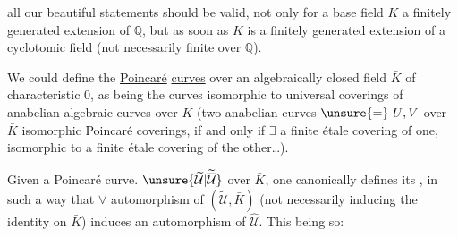 all our beautiful statements should be valid, not only for a base field $K$ a finitely generated extension of $\mathbb{Q}$, but as soon as $K$ is a finitely generated extension of a cyclotomic field (not necessarily finite over $\mathbb{Q}$).

We could define the \uline{Poincaré} \uline{curves} over an algebraically closed field $\bar K$ of characteristic $0$, as being the curves isomorphic to universal coverings of anabelian algebraic curves over $\bar K$ (two anabelian curves $\unsure{=}\ \bar U,\bar V$ over $\bar K$  isomorphic Poincaré coverings, if and only if $\exists$ a finite étale covering of one, isomorphic to a finite étale covering of the other\ldots).

Given a Poincaré curve. $\unsure{\widetilde{\mathcal U}|\widetilde{\overline{\mathcal U}}}$ over $\bar K$,  one canonically defines its , in such a way that $\forall$ automorphism of $(\widetilde{\mathcal U},\bar K)$ (not necessarily inducing the identity on $\bar K$) induces an automorphism of $\widehat{\mathcal U}$.
This being so:
